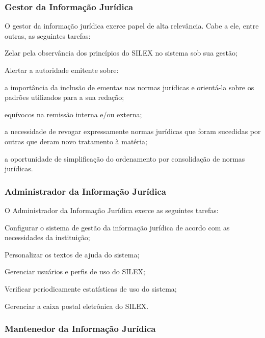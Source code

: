 \documentclass[a4paper,11pt,openright,twoside,brazil]{abntex2}
\begin{document}
\subsubsection{Gestor da Informação Jurídica}
\label{sec-papel-gestor}

O gestor da informação jurídica exerce papel de alta relevância. Cabe a ele,
entre outras, as seguintes tarefas:

\begin{alineas}
  \item Zelar pela observância dos princípios do SILEX no sistema sob sua
  gestão;
  \item Alertar a autoridade emitente sobre:
  \begin{incisos}
    \item a importância da inclusão de ementas nas normas jurídicas e orientá-la
    sobre os padrões utilizados para a sua redação;
    \item equívocos na remissão interna e/ou externa;
    \item a necessidade de revogar expressamente normas jurídicas que foram
    sucedidas por outras que deram novo tratamento à matéria;
    \item a oportunidade de simplificação do ordenamento por consolidação de
    normas jurídicas.
  \end{incisos}
\end{alineas}

\subsubsection{Administrador da Informação Jurídica}
\label{sec-papel-adm-info}

O Administrador da Informação Jurídica exerce as seguintes tarefas:

\begin{alineas}
 \item Configurar o sistema de gestão da informação jurídica de acordo com as
 necessidades da instituição;
 \item Personalizar os textos de ajuda do sistema;
 \item Gerenciar usuários e perfis de uso do SILEX;
 \item Verificar periodicamente estatísticas de uso do sistema;
 \item Gerenciar a caixa postal eletrônica do SILEX.
\end{alineas}

\subsubsection{Mantenedor da Informação Jurídica}
\label{sec-papel-mantenedor-info}
\end{document}
